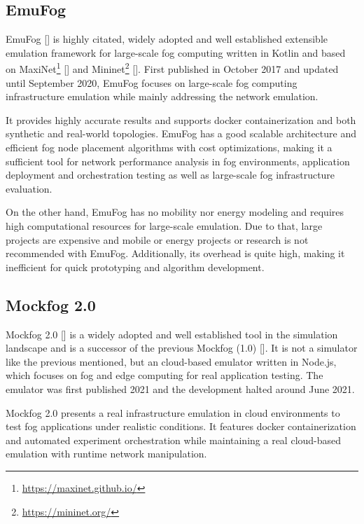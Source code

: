\subsection{EmuFog}\label{sec:EmuFog}
EmuFog [\cite{sim-emufog}] is highly citated, widely adopted and well established extensible emulation framework for large-scale fog computing written in Kotlin and based on MaxiNet\footnote{\url{https://maxinet.github.io/}} [\cite{sim-base-maxinet}] and Mininet\footnote{\url{https://mininet.org/}} [\cite{sim-base-mininet}].
First published in October 2017 and updated until September 2020, EmuFog focuses on large-scale fog computing infrastructure emulation while mainly addressing the network emulation.

It provides highly accurate results and supports docker containerization and both synthetic and real-world topologies.
EmuFog has a good scalable architecture and efficient fog node placement algorithms with cost optimizations, making it a sufficient tool for network performance analysis 
in fog environments, application deployment and orchestration testing as well as large-scale fog infrastructure evaluation.

On the other hand, EmuFog has no mobility nor energy modeling and requires high computational resources for large-scale emulation.
Due to that, large projects are expensive and mobile or energy projects or research is not recommended with EmuFog.
Additionally, its overhead is quite high, making it inefficient for quick prototyping and algorithm development.

\subsection{Mockfog 2.0}\label{sec:Mockfog 2.0}
Mockfog 2.0 [\cite{sim-mockfog2}] is a widely adopted and well established tool in the simulation landscape and is a successor of the previous Mockfog (1.0) [\cite{sim-base-mockfog1}].
It is not a simulator like the previous mentioned, but an cloud-based emulator written in Node.js, which focuses on fog and edge computing for real application testing.
The emulator was first published 2021 and the development halted around June 2021.

Mockfog 2.0 presents a real infrastructure emulation in cloud environments to test fog applications under realistic conditions.
It features docker containerization and automated experiment orchestration while maintaining a real cloud-based emulation with runtime network manipulation.

